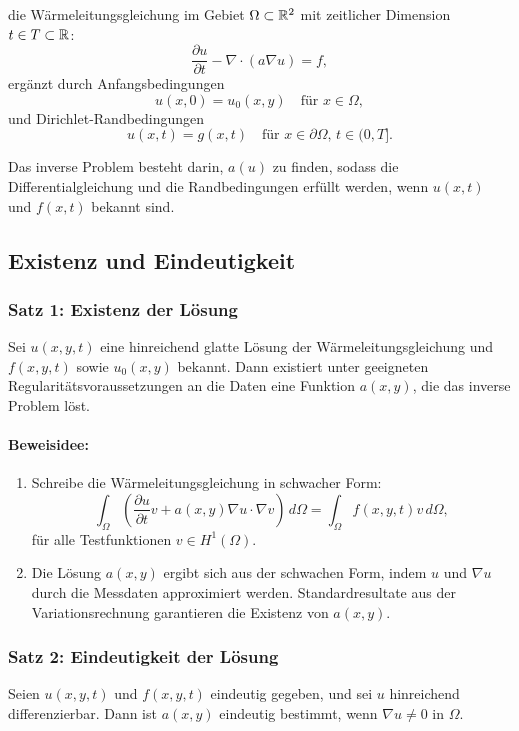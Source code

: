 die Wärmeleitungsgleichung im Gebiet $\Omega \subset \mathbb{R}^2$ mit zeitlicher Dimension $t \in T \subset \mathbb{R}$:
\[
\frac{\partial u}{\partial t} - \nabla \cdot (a \nabla u) = f,
\]
ergänzt durch Anfangsbedingungen
\[
u(x,0) = u_0(x,y) \quad \text{für } x \in \Omega,
\]
und Dirichlet-Randbedingungen
\[
u(x,t) = g(x,t) \quad \text{für } x \in \partial \Omega, \, t \in (0,T].
\]

Das inverse Problem besteht darin, $a(u)$ zu finden, sodass die Differentialgleichung und die Randbedingungen erfüllt werden, wenn $u(x,t)$ und $f(x,t)$ bekannt sind.

\subsection{Existenz und Eindeutigkeit}

\subsubsection{Satz 1: Existenz der Lösung}

Sei $u(x,y,t)$ eine hinreichend glatte Lösung der Wärmeleitungsgleichung und $f(x,y,t)$ sowie $u_0(x,y)$ bekannt. Dann existiert unter geeigneten Regularitätsvoraussetzungen an die Daten eine Funktion $a(x,y)$, die das inverse Problem löst.

\paragraph{Beweisidee:}
\begin{enumerate}
	\item Schreibe die Wärmeleitungsgleichung in schwacher Form:
	\[
	\int_{\Omega} \left( \frac{\partial u}{\partial t} v + a(x,y) \nabla u \cdot \nabla v \right) \, d\Omega = \int_{\Omega} f(x,y,t) v \, d\Omega,
	\]
	für alle Testfunktionen $v \in H^1(\Omega)$.
	\item Die Lösung $a(x,y)$ ergibt sich aus der schwachen Form, indem $u$ und $\nabla u$ durch die Messdaten approximiert werden. Standardresultate aus der Variationsrechnung garantieren die Existenz von $a(x,y)$.
\end{enumerate}

\subsubsection{Satz 2: Eindeutigkeit der Lösung}

Seien $u(x,y,t)$ und $f(x,y,t)$ eindeutig gegeben, und sei $u$ hinreichend differenzierbar. Dann ist $a(x,y)$ eindeutig bestimmt, wenn $\nabla u \neq 0$ in $\Omega$.

